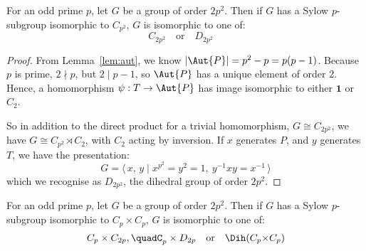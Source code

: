 \begin{lemma}
    For an odd prime \(p\), let \(G\) be a group of order \(2p^2\). Then if \(G\) has a Sylow \(p\)-subgroup isomorphic
    to \(C_{p^2}\), \(G\) is isomorphic to one of:
    \[%
        C_{2p^2} \quad \text{or} \quad%
        D_{2p^2} \quad%
    \]
\end{lemma}

\begin{proof}
        From Lemma~\ref{lem:aut}, we know \(|\Aut{P}| = p^2 - p = p(p-1)\).
        Because \(p\) is prime, \(2 \nmid p\), but \( 2 \mid p - 1\), so \(\Aut{P}\) has a unique element of order 2.
        Hence, a homomorphism \(\psi:T \to \Aut{P}\) has image isomorphic to either \(\bm{1}\) or \(C_{2}\).

        So in addition to the direct product for a trivial homomorphism, \(G \cong C_{2p^2}\), we have \(G \cong
        C_{p^2} \rtimes C_2\), with \(C_2\) acting by inversion.
        If \(x\) generates \(P\), and \(y\) generates \(T\), we have the presentation:
        \[G = \langle\, x,\,y \mid x^{p^2} = y^2 = 1,\ y^{-1}xy = x^{-1}\,\rangle\]
        which we recognise as \(D_{2p^2}\), the dihedral group of order \(2p^2\).
\end{proof}

\begin{lemma}
    For an odd prime \(p\), let \(G\) be a group of order \(2p^2\). Then if \(G\) has a Sylow \(p\)-subgroup isomorphic
    to \(C_p \times C_{p}\), \(G\) is isomorphic to one of:
    \[%
        C_p \times C_{2p}, \quad%
        C_p \times D_{2p} \quad \text{or} \quad%
        \Dih(C_p {\times} C_p)
    \]
\end{lemma}

